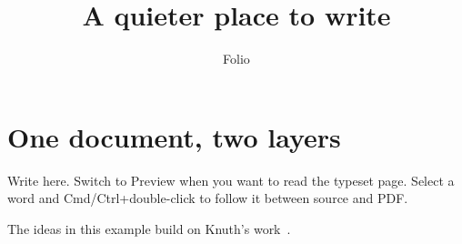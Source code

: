 \documentclass[11pt]{article}
\title{A quieter place to write}
\author{Folio}
\date{}
\begin{document}
\maketitle

\section{One document, two layers}
Write here. Switch to Preview when you want to read the typeset page.
Select a word and Cmd/Ctrl+double-click to follow it between source and PDF.



The ideas in this example build on Knuth's work~\cite{knuth1984}.


\end{document}
